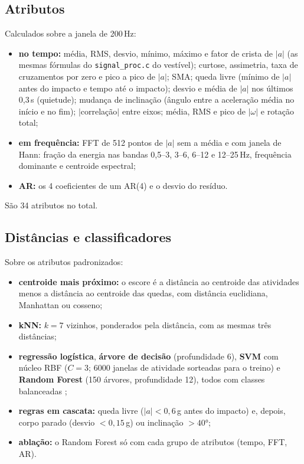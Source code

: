 \documentclass[12pt,a4paper]{article}
\newcommand{\code}[1]{\texttt{#1}}
\newcommand{\amag}{|a|}
\newcommand{\wmag}{|\omega|}
\begin{document}
\subsection{Atributos}\label{sec:atributos}
Calculados sobre a janela de 200\,Hz:
\begin{itemize}[leftmargin=1.5em]
\item \textbf{no tempo:} média, RMS, desvio, mínimo, máximo e fator de crista de
  $\amag$ (as mesmas fórmulas do \code{signal\_proc.c} do vestível); curtose,
  assimetria, taxa de cruzamentos por zero e pico a pico de $\amag$; SMA; queda livre
  (mínimo de $\amag$ antes do impacto e tempo até o impacto); desvio e média de $\amag$
  nos últimos 0,3\,s (quietude); mudança de inclinação (ângulo entre a aceleração média
  no início e no fim); $|$correlação$|$ entre eixos; média, RMS e pico de $\wmag$ e
  rotação total;
\item \textbf{em frequência:} FFT de 512 pontos de $\amag$ sem a média e com janela de
  Hann: fração da energia nas bandas 0,5--3, 3--6, 6--12 e 12--25\,Hz, frequência
  dominante e centroide espectral;
\item \textbf{AR:} os 4 coeficientes de um AR(4) e o desvio do resíduo.
\end{itemize}
São 34 atributos no total.

\subsection{Distâncias e classificadores}
Sobre os atributos padronizados:
\begin{itemize}[leftmargin=1.5em]
\item \textbf{centroide mais próximo:} o escore é a distância ao centroide das
  atividades menos a distância ao centroide das quedas, com distância euclidiana,
  Manhattan ou cosseno;
\item \textbf{kNN:} $k=7$ vizinhos, ponderados pela distância, com as mesmas três
  distâncias;
\item \textbf{regressão logística}, \textbf{árvore de decisão} (profundidade 6),
  \textbf{SVM} com núcleo RBF ($C=3$; 6000 janelas de atividade sorteadas para o
  treino) e \textbf{Random Forest} \cite{breiman} (150 árvores, profundidade 12), todos
  com classes balanceadas \cite{sklearn};
\item \textbf{regras em cascata:} queda livre ($\amag<0{,}6$\,g antes do impacto) e,
  depois, corpo parado (desvio $<0{,}15$\,g) ou inclinação $>40$°;
\item \textbf{ablação:} o Random Forest só com cada grupo de atributos (tempo, FFT, AR).
\end{itemize}
\end{document}

